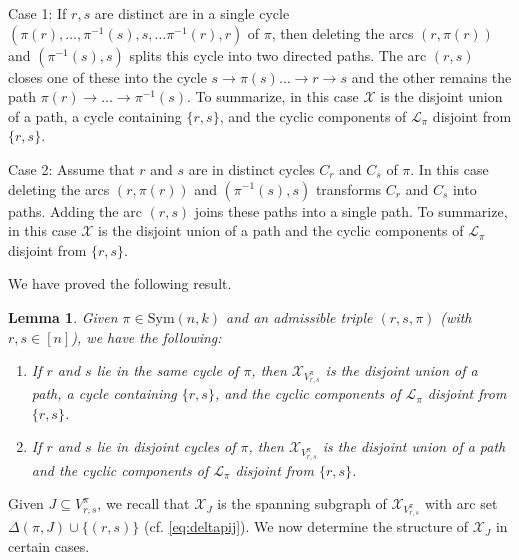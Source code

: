 \documentclass{amsart}
\newtheorem{lem}[thm]{Lemma}
\newcommand{\mcal}{\mathcal}
\newcommand{\sym}{\mathrm{Sym}}
\begin{document}
Case 1: If $r,s$ are distinct are in a single cycle $(\pi(r),\ldots,\pi^{-1}(s),s,\ldots \pi^{-1}(r),r)$ of $\pi$, then deleting the arcs $(r,\pi(r))$ and $(\pi^{-1}(s),s)$ splits this cycle into two directed paths. The arc $(r,s)$ closes one of these into the cycle $s\to\pi(s)\ldots\to r\to s$ and the other remains the path $\pi(r)\to\ldots \to \pi^{-1}(s)$. To summarize, in this case $\mcal{X}$ is the disjoint union of a path, a cycle containing $\{r,s\}$, and the cyclic components of $\mcal{L}_{\pi}$ disjoint from $\{r,s\}$.

Case 2: Assume that $r$ and $s$ are in distinct cycles $C_{r}$ and $C_{s}$ of $\pi$. In this case deleting the arcs $(r,\pi(r))$ and $(\pi^{-1}(s),s)$ transforms $C_{r}$ and $C_{s}$ into paths. Adding the arc $(r,s)$ joins these paths into a single path. To summarize, in this case $\mcal{X}$ is the disjoint union of a path and the cyclic components of $\mcal{L}_{\pi}$ disjoint from $\{r,s\}$.

We have proved the following result.
\begin{lem}\label{lem:structureofX}
Given $\pi \in \sym(n,k)$ and an admissible triple $(r,s,\pi)$ (with $r,s\in [n]$), we have the following:
\begin{enumerate}
\item If $r$ and $s$ lie in the same cycle of $\pi$, then $\mcal{X}_{V_{r,s}^{\pi}}$ is the disjoint union of a path, a cycle containing $\{r,s\}$, and the cyclic components of $\mcal{L}_{\pi}$ disjoint from $\{r,s\}$.
\item If $r$ and $s$ lie in disjoint cycles of $\pi$, then $\mcal{X}_{V_{r,s}^{\pi}}$ is the disjoint union of a path and the cyclic components of $\mcal{L}_{\pi}$ disjoint from $\{r,s\}$.
\end{enumerate}
\end{lem}

Given $J\subseteq V_{r,s}^{\pi}$, we recall that $\mcal{X}_{J}$ is the spanning subgraph of $\mcal{X}_{V_{r,s}^{\pi}}$ with arc set $\Delta(\pi,J) \cup \{(r,s)\}$ (cf. \eqref{eq:deltapij}). We now determine the structure of $\mcal{X}_{J}$ in certain cases.
\end{document}
